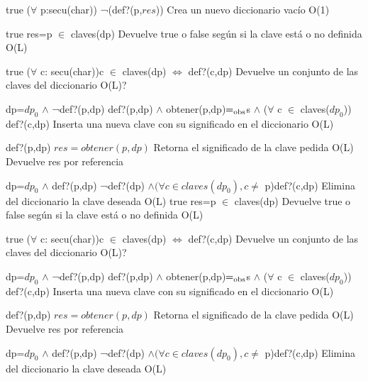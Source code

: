 {true}
{($\forall$ p:secu(char)) ¬(def?(p,$res$))}
{Crea un nuevo diccionario vac\'io}
{O(1)}
{}


{true}
{res=p $\in$ claves(dp)}
{Devuelve true o false seg\'un si la clave est\'a o no definida}
{O(L)}
{}

{true}
{($\forall$ c: secu(char))c $\in$ claves(dp) $\iff$ def?(c,dp)}
{Devuelve un conjunto de las claves del diccionario}
{O(L)?}
{}

{dp=$dp_0$ $\land$ ¬def?(p,dp)}
{def?(p,dp) $\land$ obtener(p,dp)$=_{\mathrm{obs}}$s $\land$ ($\forall$ c $\in$ claves($dp_0$)) def?(c,dp)}
{Inserta una nueva clave con su significado en el diccionario}
{O(L)}
{}


{def?(p,dp)}
{$res = obtener(p,dp)$}
{Retorna el significado de la clave pedida}
{O(L)}
{Devuelve res por referencia}


{dp=$dp_0$ $\land$ def?(p,dp)}
{¬def?(dp) $\land (\forall c \in claves(dp_0),c\neq$ p)def?(c,dp)}
{Elimina del diccionario la clave deseada}
{O(L)}
{}
{true}
{res=p $\in$ claves(dp)}
{Devuelve true o false seg\'un si la clave est\'a o no definida}
{O(L)}
{}

{true}
{($\forall$ c: secu(char))c $\in$ claves(dp) $\iff$ def?(c,dp)}
{Devuelve un conjunto de las claves del diccionario}
{O(L)?}
{}

{dp=$dp_0$ $\land$ ¬def?(p,dp)}
{def?(p,dp) $\land$ obtener(p,dp)$=_{\mathrm{obs}}$s $\land$ ($\forall$ c $\in$ claves($dp_0$)) def?(c,dp)}
{Inserta una nueva clave con su significado en el diccionario}
{O(L)}
{}


{def?(p,dp)}
{$res = obtener(p,dp)$}
{Retorna el significado de la clave pedida}
{O(L)}
{Devuelve res por referencia}


{dp=$dp_0$ $\land$ def?(p,dp)}
{¬def?(dp) $\land (\forall c \in claves(dp_0),c\neq$ p)def?(c,dp)}
{Elimina del diccionario la clave deseada}
{O(L)}
{}
